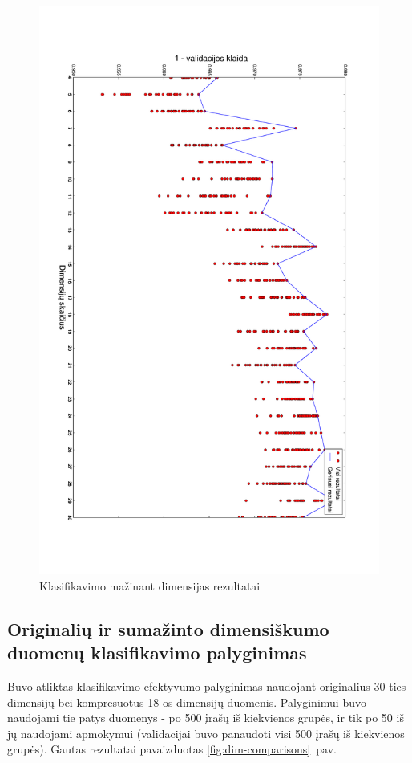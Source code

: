 \documentclass{VUMIFPSbakalaurinis}
\begin{document}
\begin{figure}
	\includegraphics[scale=0.32]{pics/dimensions_2015-5-27_6-18-5}
	\caption{Klasifikavimo mažinant dimensijas rezultatai}
	\label{fig:experiment-2}
\end{figure}


\subsection{Originalių ir sumažinto dimensiškumo duomenų klasifikavimo palyginimas}

Buvo atliktas klasifikavimo efektyvumo palyginimas naudojant originalius 30-ties dimensijų bei kompresuotus 18-os dimensijų duomenis.
Palyginimui buvo naudojami tie patys duomenys - po 500 įrašų iš kiekvienos grupės, ir tik po 50 iš jų naudojami apmokymui (validacijai buvo panaudoti visi 500 įrašų iš kiekvienos grupės).
Gautas rezultatai pavaizduotas \ref{fig:dim-comparisons}~pav.
\end{document}
